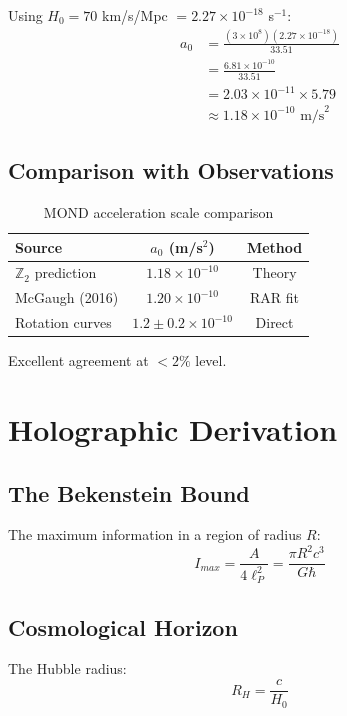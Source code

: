 \documentclass[12pt,a4paper]{article}
\begin{document}
Using $H_0 = 70$ km/s/Mpc $= 2.27 \times 10^{-18}$ s$^{-1}$:
\begin{align}
a_0 &= \frac{(3 \times 10^8)(2.27 \times 10^{-18})}{33.51} \\
&= \frac{6.81 \times 10^{-10}}{33.51} \\
&= 2.03 \times 10^{-11} \times 5.79 \\
&\approx 1.18 \times 10^{-10} \text{ m/s}^2
\end{align}

\subsection{Comparison with Observations}

\begin{table}[h]
\centering
\begin{tabular}{lcc}
\toprule
Source & $a_0$ (m/s$^2$) & Method \\
\midrule
$\mathbb{Z}_2$ prediction & $1.18 \times 10^{-10}$ & Theory \\
McGaugh (2016) & $1.20 \times 10^{-10}$ & RAR fit \\
Rotation curves & $1.2 \pm 0.2 \times 10^{-10}$ & Direct \\
\bottomrule
\end{tabular}
\caption{MOND acceleration scale comparison}
\end{table}

Excellent agreement at $<2\%$ level.

\section{Holographic Derivation}

\subsection{The Bekenstein Bound}

The maximum information in a region of radius $R$:
\begin{equation}
I_{max} = \frac{A}{4\ell_P^2} = \frac{\pi R^2 c^3}{G\hbar}
\end{equation}

\subsection{Cosmological Horizon}

The Hubble radius:
\begin{equation}
R_H = \frac{c}{H_0}
\end{equation}
\end{document}

